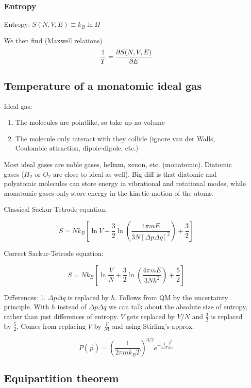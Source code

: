 \subsubsection{Entropy}

Entropy: $S(N, V, E) \equiv k_B \ln \Omega$

We then find (Maxwell relations)
$$\frac{1}{T} = \pdv{S(N,V,E)}{E}$$

\subsection{Temperature of a monatomic ideal gas}

Ideal gas: 
\begin{enumerate}
    \item The molecules are pointlike, so take up no volume
    \item The molecule only interact with they collide (ignore van der Walls, Coulombic attraction, dipole-dipole, etc.)
\end{enumerate}

Most ideal gases are noble gases, helium, xenon, etc. (monatomic). Diatomic gases ($H_2$ or $O_2$ are close to ideal as well). Big diff is that diatomic and polyatomic molecules can store energy in vibrational and rotational modes, while monatomic gases only store energy in the kinetic motion of the atoms.

Classical Sackur-Tetrode equation:

$$S = N k_B [ \ln V + \frac{3}{2} \ln(\frac{4 \pi m E}{3N [\Delta p \Delta q]^2}) + \frac{3}{2} ]$$

Correct Sackur-Tetrode equation:

$$S = N k_B[\ln \frac{V}{N} + \frac{3}{2} \ln (\frac{4 \pi m E}{3Nh^2}) + \frac{5}{2}]$$

Differences: 1. $\Delta p \Delta q$ is replaced by $h$. Follows from QM by the uncertainty principle. With $h$ instead of $\Delta p \Delta q$ we can talk about the absolute size of entropy, rather than just differences of entropy. $V$ gets replaced by $V/N$ and $\frac{3}{2}$ is replaced by $\frac{5}{2}$. Comes from replacing $V$ by $\frac{V}{N!}$ and using Stirling's approx.

$$P(\vec{p}) = (\frac{1}{2 \pi m k_B T})^{3/2} e^{-\frac{1}{k_BT} \frac{\vec{p}^2}{2m}}$$

\subsection{Equipartition theorem}

